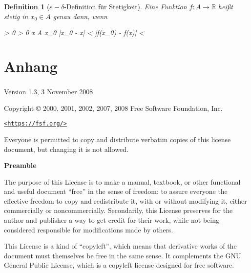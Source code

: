 \documentclass{article}
\newtheorem{defn}{Definition}[section]
\newenvironment{aleq*}{\begin{equation*}\begin{aligned}}{\end{aligned}\end{equation*}}
\begin{document}
	\begin{defn}[\(\varepsilon-\delta\)-Definition für Stetigkeit]
		Eine Funktion \(f \colon A \to \mathbb{R}\) heißt stetig in \(x_0 \in A\) genau dann, wenn
		\begin{aleq*}
			\forall \varepsilon > 0 \colon \exists \delta > 0 \colon \forall x \in A \setminus \left\lbrace x_0 \right\rbrace \colon |x_0 - x| < \delta \implies |f(x_0) - f(x)| < \varepsilon {}
		\end{aleq*}
	\end{defn}
	
	\newpage
	
	\part{Anhang}
	\section{}
	\label{sec:fdl}
	
	\begin{center}
		
		Version 1.3, 3 November 2008
		
		
		Copyright \copyright{} 2000, 2001, 2002, 2007, 2008  Free Software Foundation, Inc.
		
		\bigskip
		
		\href{https://fsf.org/}{\texttt{<https://fsf.org/>}}
		
		\bigskip
		
		Everyone is permitted to copy and distribute verbatim copies
		of this license document, but changing it is not allowed.
	\end{center}
	
	
	\begin{center}
		{\bf\large Preamble}
	\end{center}
	
	The purpose of this License is to make a manual, textbook, or other
	functional and useful document ``free'' in the sense of freedom: to
	assure everyone the effective freedom to copy and redistribute it,
	with or without modifying it, either commercially or noncommercially.
	Secondarily, this License preserves for the author and publisher a way
	to get credit for their work, while not being considered responsible
	for modifications made by others.
	
	This License is a kind of ``copyleft'', which means that derivative
	works of the document must themselves be free in the same sense.  It
	complements the GNU General Public License, which is a copyleft
	license designed for free software.
	
\end{document}
